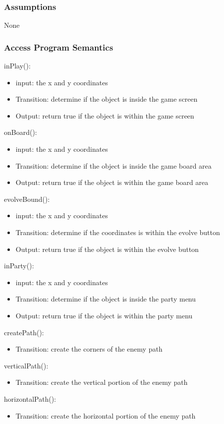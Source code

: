 \documentclass[12,english]{article}
\begin{document}
\subsubsection{Assumptions}
None
\subsubsection{Access Program Semantics}

\noindent inPlay():
\begin{itemize}
    \item input: the x and y coordinates
    \item Transition: determine if the object is inside the game screen
    \item Output: return true if the object is within the game screen
\end{itemize}

\noindent onBoard():
\begin{itemize}
    \item input: the x and y coordinates
    \item Transition: determine if the object is inside the game board area
    \item Output: return true if the object is within the game board area
\end{itemize}

\noindent evolveBound():
\begin{itemize}
    \item input: the x and y coordinates
    \item Transition: determine if the coordinates is within the evolve button
    \item Output: return true if the object is within the evolve button
\end{itemize}

\noindent inParty():
\begin{itemize}
    \item input: the x and y coordinates
    \item Transition: determine if the object is inside the party menu
    \item Output: return true if the object is within the party menu
\end{itemize}

\noindent createPath():
\begin{itemize}
    \item Transition: create the corners of the enemy path
\end{itemize}

\noindent verticalPath():
\begin{itemize}
    \item Transition: create the vertical portion of the enemy path
\end{itemize}

\noindent horizontalPath():
\begin{itemize}
    \item Transition: create the horizontal portion of the enemy path
\end{itemize}
\end{document}
